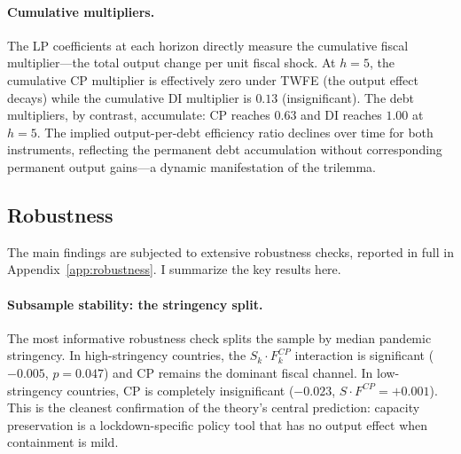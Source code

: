 
\paragraph{Cumulative multipliers.} The LP coefficients at each horizon directly measure the cumulative fiscal multiplier---the total output change per unit fiscal shock. At $h = 5$, the cumulative CP multiplier is effectively zero under TWFE (the output effect decays) while the cumulative DI multiplier is $0.13$ (insignificant). The debt multipliers, by contrast, accumulate: CP reaches $0.63$ and DI reaches $1.00$ at $h = 5$. The implied output-per-debt efficiency ratio declines over time for both instruments, reflecting the permanent debt accumulation without corresponding permanent output gains---a dynamic manifestation of the trilemma.


\subsection{Robustness}
\label{subsec:robustness}

The main findings are subjected to extensive robustness checks, reported in full in Appendix~\ref{app:robustness}. I summarize the key results here.

\paragraph{Subsample stability: the stringency split.} The most informative robustness check splits the sample by median pandemic stringency. In high-stringency countries, the $S_k \cdot F_k^{CP}$ interaction is significant ($-0.005$, $p = 0.047$) and CP remains the dominant fiscal channel. In low-stringency countries, CP is completely insignificant ($-0.023$, $S \cdot F^{CP} = +0.001$). This is the cleanest confirmation of the theory's central prediction: capacity preservation is a lockdown-specific policy tool that has no output effect when containment is mild.

